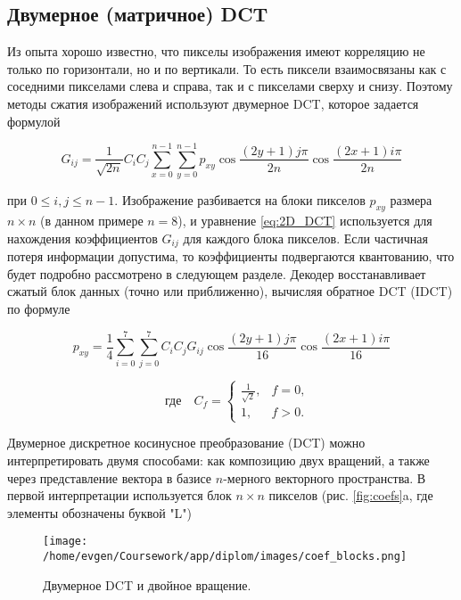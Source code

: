 \subsection{Двумерное (матричное) DCT}

Из опыта хорошо известно, что пикселы изображения имеют корреляцию  не только по горизонтали, но и по вертикали. 
То есть пиксели взаимосвязаны как с соседними пикселами слева и справа, так и с пикселами сверху и снизу. 
Поэтому методы сжатия изо­бражений используют двумерное DCT, которое задается формулой

\begin{equation}
    G_{ij} = \frac{1}{\sqrt{2n}} C_i C_j\sum_{x=0}^{n-1} \sum_{y=0}^{n-1} p_{xy} \cos{\frac{(2y+1)j \pi}{2n} \cos{\frac{(2x+1)i \pi}{2n}}}
    \label{eq:2D_DCT}
\end{equation}

при $0 \leq i, j \leq n - 1$. Изображение разбивается на блоки пикселов $p_{xy}$ размера $n \times n$ (в данном примере $n = 8$), 
и уравнение \eqref{eq:2D_DCT} используется для нахождения коэффициентов $G_{ij}$ для каждого блока пикселов.
Если частичная потеря информации допустима, то коэффициенты подвергаются квантованию, что будет подробно рассмотрено в следующем разделе. 
Декодер восстанавливает сжатый блок данных (точно или приближенно), вычисляя обратное DCT (IDCT) по формуле


\begin{equation}
    p_{xy} = \frac{1}{4} \sum_{i = 0}^{7} \sum_{j = 0}^{7} C_i C_j G_{ij} \cos{\frac{(2y+1)j \pi}{16} \cos{\frac{(2x+1)i \pi}{16}}}
    \label{eq:I2D_DCT}
\end{equation}

$$
\quad \text{где} \quad C_f = 
\left\{
    \begin{array}{ll}
        \frac{1}{\sqrt{2}}, & f = 0, \\
        1, & f > 0. 
    \end{array}
\right.
$$


Двумерное дискретное косинусное преобразование (DCT) можно интерпретировать двумя способами: как композицию двух вращений, 
а также через представление вектора в базисе $n$-мерного векторного пространства. 
В первой ин­терпретации используется блок $n \times n$ пикселов (рис. \eqref{fig:coefs}a, где элементы обозначены буквой "L")


\begin{figure}[h!]
    \centering
    \texttt{[image: /home/evgen/Coursework/app/diplom/images/coef\_blocks.png]}
    \caption{Двумерное DCT и двойное вращение.}
    \label{fig:coefs}
\end{figure}


